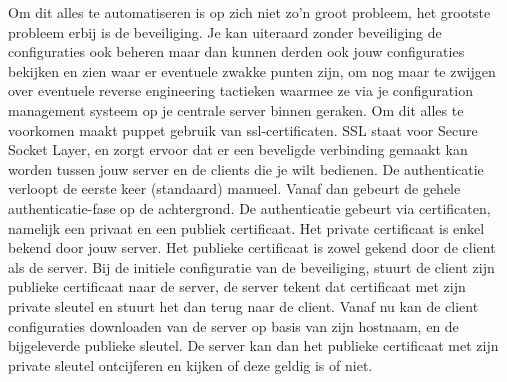 Om dit alles te automatiseren is op zich niet zo'n groot probleem, het grootste probleem erbij is de beveiliging. Je kan uiteraard zonder beveiliging de configuraties ook beheren maar dan kunnen derden ook jouw configuraties bekijken en zien waar er eventuele zwakke punten zijn, om nog maar te zwijgen over eventuele reverse engineering tactieken waarmee ze via je configuration management systeem op je centrale server binnen geraken.
Om dit alles te voorkomen maakt puppet gebruik van ssl-certificaten. SSL staat voor Secure Socket Layer, en zorgt ervoor dat er een beveligde verbinding gemaakt kan worden tussen jouw server en de clients die je wilt bedienen. De authenticatie verloopt de eerste keer (standaard) manueel. Vanaf dan gebeurt de gehele authenticatie-fase op de achtergrond. De authenticatie gebeurt via certificaten, namelijk een privaat en een publiek certificaat. Het private certificaat is enkel bekend door jouw server. Het publieke certificaat is zowel gekend door de client als de server. Bij de initiele configuratie van de beveiliging, stuurt de client zijn publieke certificaat naar de server, de server tekent dat certificaat met zijn private sleutel en stuurt het dan terug naar de client. Vanaf nu kan de client configuraties downloaden van de server op basis van zijn hostnaam, en de bijgeleverde publieke sleutel. De server kan dan het publieke certificaat met zijn private sleutel ontcijferen en kijken of deze geldig is of niet.
